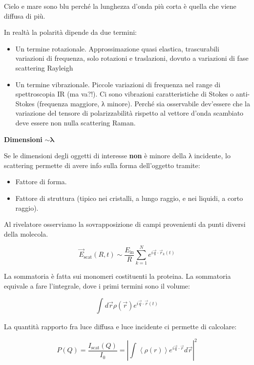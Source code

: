 Cielo e mare sono blu perché la lunghezza d'onda più corta è quella che
viene diffusa di più.

In realtà la polarità dipende da due termini:

\begin{itemize}
\item
  Un termine rotazionale. Approssimazione quasi elastica, trascurabili
  variazioni di frequenza, solo rotazioni e traslazioni, dovuto a
  variazioni di fase scattering Rayleigh
\item
  Un termine vibrazionale. Piccole variazioni di frequenza nel range di
  spettroscopia IR (ma va?!). Ci sono vibrazioni caratteristiche di
  Stokes o anti-Stokes (frequenza maggiore, λ minore). Perché sia
  osservabile dev'essere che la variazione del tensore di
  polarizzabilità rispetto al vettore d'onda scambiato deve essere non
  nulla scattering Raman.
\end{itemize}

\textbf{Dimensioni} \(\mathbf{\sim \lambda}\)

Se le dimensioni degli oggetti di interesse \textbf{non} è minore della
λ incidente, lo scattering permette di avere info sulla forma
dell'oggetto tramite:

\begin{itemize}
\item
  Fattore di forma.
\item
  Fattore di struttura (tipico nei cristalli, a lungo raggio, e nei
  liquidi, a corto raggio).
\end{itemize}

Al rivelatore osserviamo la sovrapposizione di campi provenienti da
punti diversi della molecola.

\[{\overrightarrow{E}}_{\text{scat}}\left( R,t \right) \sim \frac{E_{\text{in}}}{R}\sum_{k = 1}^{N}e^{i\overrightarrow{q} \cdot {\overrightarrow{r}}_{k}\left( t \right)}\]

La sommatoria è fatta sui monomeri costituenti la proteina. La
sommatoria equivale a fare l'integrale, dove i primi termini sono il
volume:

\[\int_{}^{}{d\overrightarrow{r}\rho\left( \overrightarrow{r} \right)e^{i\overrightarrow{q} \cdot \overrightarrow{r}(t)}}\]

La quantità rapporto fra luce diffusa e luce incidente ci permette di
calcolare:

\[P\left( Q \right) = \frac{I_{\text{scat}}\left( Q \right)}{I_{0}} = \left| \int_{}^{}{\left\langle \rho\left( r \right) \right\rangle e^{i\overrightarrow{q} \cdot \overrightarrow{r}}d\overrightarrow{r}} \right|^{2}\]

